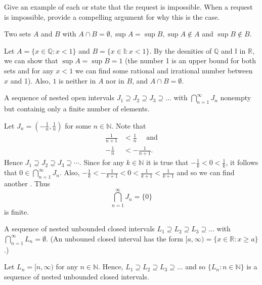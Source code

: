 \documentclass[12pt]{article}
\newcommand{\N}{\mathbb{N}}
\newcommand{\R}{\mathbb{R}}
\newcommand{\Q}{\mathbb{Q}}
\newenvironment{problem}[2][Problem]{\begin{trivlist}
		\item[\hskip \labelsep {\bfseries #1}\hskip \labelsep {\bfseries #2.}]}{\end{trivlist}}
\newenvironment{solution}[2][Solution]{\begin{trivlist}
		\item[\hskip \labelsep {\bfseries #1}\hskip \labelsep {\bfseries #2.}]}{\end{trivlist}}
\begin{document}
	\begin{problem}{1.4.8}
		Give an example of each or state that the request is impossible. When a request is impossible, provide a compelling argument for why this is the case.
		\begin{enumerate}[label=(\alph*)]
			\item Two sets $A$ and $B$ with $A\cap B = \emptyset, \sup A=\sup B, \sup A \not\in A$ and $\sup B \not\in B$.
			\begin{solution}{(a)}
				Let $A=\{x\in \Q:x<1\}$ and $B=\{x\in \mathbb{I}:x<1\}$. By the desnities of $\Q$ and $\mathbb{I}$ in $\R$, we can show that $\sup A = \sup B = 1$ (the number 1 is an upper bound for both sets and for any $x<1$ we can find some rational and irrational number between $x$ and 1). Also, $1$ is neither in $A$ nor in $B$, and $A\cap B = \emptyset$. 
			\end{solution}
			\item A sequence of nested open intervals $J_{1} \supseteq J_{2} \supseteq J_{3} \supseteq \ldots$ with $\bigcap^{\infty}_{n=1} J_{n}$ nonempty but containig only a finite number of elements.
			\begin{solution}{(b)}
				Let $J_{n} = (-\frac{1}{n},\frac{1}{n})$ for some $n\in \N$. Note that 
				\begin{align*}
					\frac{1}{n+1}&<\frac{1}{n} \quad \text{ and}\\
					-\frac{1}{n} &< -\frac{1}{n+1}.
				\end{align*}
				Hence $J_{1}\supseteq J_{2} \supseteq J_{3} \supseteq \cdots$.
				Since for any $k\in \N$ it is true that $-\frac{1}{k}<0<\frac{1}{k}$, it follows that $0\in \bigcap_{n=1}^{\infty}J_{n}$. Also, $-\frac{1}{k} < -\frac{1}{k+1}< 0 < \frac{1}{k+1} < \frac{1}{k+1}$ and so we can find another . Thus
				\begin{equation*}
					\bigcap_{n=1}^{\infty} J_{n} = \{0\}
				\end{equation*}
				is finite.
			\end{solution}
			\item A sequence of nested unbounded closed intervals $L_{1} \supseteq L_{2} \supseteq L_{3} \supseteq \ldots$ with $\bigcap_{n=1}^{\infty} L_{n} = \emptyset$. (An unbouned closed interval has the form $[a,\infty) = \{x\in \R : x\geq a\}$.)
			\begin{solution}{(c)}
				Let $L_{n} = [n,\infty)$ for any $n\in \N$. Hence, $L_{1} \supseteq L_{2} \supseteq L_{3} \supseteq \ldots$ and so $\{L_{n}:n\in \N\}$ is a sequence of nested unbounded closed intervals. \\

\end{solution}
\end{enumerate}
\end{problem}
\end{document}
